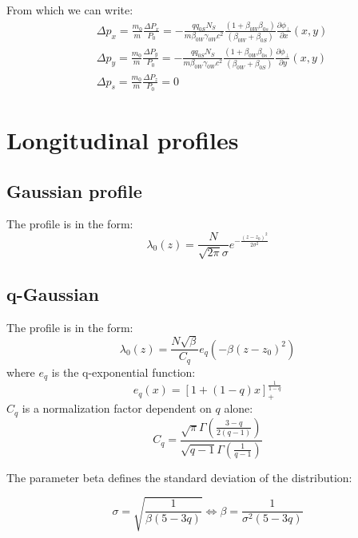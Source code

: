 From which we can write:
\begin{align}
&\boxed{
\Delta p_x = \frac{m_0}{m}\frac{\Delta P_x} {P_0}= -\frac{qq_{0S} N_S 
}{m\beta_{0W}\gamma_{0W}c^2}
\frac{(1+\beta_{0W}  \beta_{0s})}{(\beta_{0W}+\beta_{0S})}
\frac{\partial \phi_\perp}{\partial x}(x, y )}\\
&\boxed{
\Delta p_y = \frac{m_0}{m}\frac{\Delta P_y} {P_0}= -\frac{qq_{0S} N_S 
}{m\beta_{0W}\gamma_{0W}c^2}
\frac{(1+\beta_{0W}  \beta_{0s})}{(\beta_{0W}+\beta_{0S})}
\frac{\partial \phi_\perp}{\partial y}(x, y )}\\
&\boxed{
\Delta p_s = \frac{m_0}{m}\frac{\Delta P_z} {P_0}=0}
\end{align}

\section{Longitudinal profiles}

\subsection{Gaussian profile}

The profile is in the form:
\begin{equation}
\lambda_{0}(z)=\frac{N}{\sqrt{2 \pi} \sigma} e^{-\frac{(z-z_0)^{2}}{2 \sigma^{2}}}
\end{equation}


\subsection{q-Gaussian}

The profile is in the form:
\begin{equation}
\lambda_0(z)=\frac{N\sqrt{\beta}}{C_{q}} e_{q}\left(-\beta (z-z_0)^{2}\right)
\end{equation}
where $e_q$ is the q-exponential function:
\begin{equation}
e_{q}(x)=[1+(1-q) x]_{+}^{\frac{1}{1-q}}
\end{equation}
$C_q$ is a normalization factor dependent on $q$ alone:
\begin{equation}
C_{q}=\frac{\sqrt{\pi} \Gamma\left(\frac{3-q}{2(q-1)}\right)}{\sqrt{q-1} \Gamma\left(\frac{1}{q-1}\right)}
\end{equation}

The parameter beta defines the standard deviation of the distribution:

\begin{equation}
\sigma = \sqrt{\frac{1}{\beta(5-3 q)}} \iff \beta ={\frac{1}{\sigma^2(5-3 q)}}
\end{equation}



